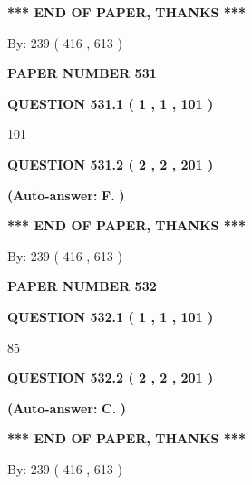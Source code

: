 \documentclass{ctexart}
\begin{document}
 
   
   
   
   
\vspace{1.0in} 
{\textbf{\large{ *** END OF PAPER, THANKS *** }}} 
   
   
\hspace{1.0in} By: 
 239 ( 416 ,  613 )
   
   
   
   
\newpage 
\setcounter{page}{ 
   531001 } 
   
   
 {\textbf{ \Large{ PAPER NUMBER  531  }}}
   
   
   
   
  
  
{\textbf{\large{QUESTION
531.1 
 ( 1 , 1 , 101 )
}}}

101
  
  
{\textbf{\large{QUESTION
531.2 
 ( 2 , 2 , 201 )
}}}
 
 
{\textbf{(Auto-answer:}}
{\textbf{\large{
F.}}}
{\textbf{)}}
 
 
   
   
   
   
\vspace{1.0in} 
{\textbf{\large{ *** END OF PAPER, THANKS *** }}} 
   
   
\hspace{1.0in} By: 
 239 ( 416 ,  613 )
   
   
   
   
\newpage 
\setcounter{page}{ 
   532001 } 
   
   
 {\textbf{ \Large{ PAPER NUMBER  532  }}}
   
   
   
   
  
  
{\textbf{\large{QUESTION
532.1 
 ( 1 , 1 , 101 )
}}}

85
  
  
{\textbf{\large{QUESTION
532.2 
 ( 2 , 2 , 201 )
}}}
 
 
{\textbf{(Auto-answer:}}
{\textbf{\large{
C.}}}
{\textbf{)}}
 
 
   
   
   
   
\vspace{1.0in} 
{\textbf{\large{ *** END OF PAPER, THANKS *** }}} 
   
   
\hspace{1.0in} By: 
 239 ( 416 ,  613 )
   
   
   
   
\newpage 
\setcounter{page}{ 
   533001 } 
   
\end{document}
